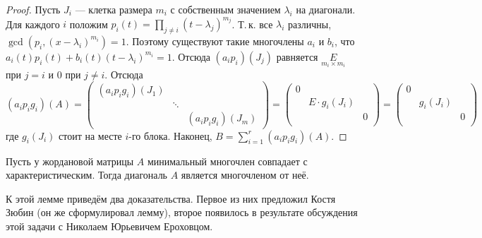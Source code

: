\begin{proof}
    Пусть $J_i$ --- клетка размера $m_i$ с собственным значением $\lambda_i$ на диагонали. Для каждого $i$ положим $p_i(t) = \prod\limits_{j \ne i}(t - \lambda_j)^{m_j}$. Т.\,к. все $\lambda_i$ различны, $\gcd(p_i, (x - \lambda_i)^{m_i}) = 1$. Поэтому существуют такие многочлены $a_i$ и $b_i$, что $a_i(t)p_i(t) + b_i(t)(t - \lambda_i)^{m_i} = 1$. Отсюда $(a_ip_i)(J_{j})$ равняется $\underset{m_i \times m_i}{E}$ при $j = i$ и $0$ при $j \ne i$. Отсюда
    \[
        (a_ip_ig_i)(A) =
        \begin{pmatrix}
            (a_ip_ig_i)(J_1) & & \\
             & \ddots & \\
             & & (a_ip_ig_i)(J_m)
        \end{pmatrix} = 
        \begin{pmatrix}
            0 & & \\
            & E \cdot g_i(J_i) & \\
             & & 0\\
        \end{pmatrix} =
        \begin{pmatrix}
            0 & & \\
            & g_i(J_i) & \\
             & & 0\\
        \end{pmatrix}
    \]
    где $g_i(J_i)$ стоит на месте $i$-го блока. Наконец, $B = \sum\limits_{i = 1}^r(a_ip_ig_i)(A)$.
\end{proof}

\begin{lemma}
    Пусть у жордановой матрицы $A$ минимальный многочлен совпадает с характеристическим. Тогда диагональ $A$ является многочленом от неё.
\end{lemma}

К этой лемме приведём два доказательства. Первое из них предложил Костя Зюбин (он же сформулировал лемму), второе появилось в результате обсуждения этой задачи с Николаем Юрьевичем Ероховцом.

